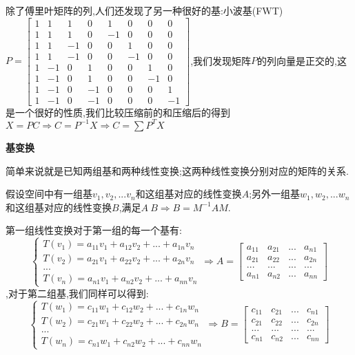 \documentclass[oneside]{book}
\begin{document}
	除了傅里叶矩阵的列,人们还发现了另一种很好的基:小波基(FWT)$P=\left[\begin{array}{cccccccc}
		1&1&1&0&1&0&0&0\\	1&1&1&0&-1&0&0&0\\
		1&1&-1&0&0&1&0&0\\	1&1&-1&0&0&-1&0&0\\	1&-1&0&1&0&0&1&0\\	1&-1&0&1&0&0&-1&0\\	1&-1&0&-1&0&0&0&1\\	1&-1&0&-1&0&0&0&-1
	\end{array}\right]$,我们发现矩阵$P$的列向量是正交的,这是一个很好的性质,我们比较压缩前的和压缩后的得到$X=PC\Rightarrow C=P^{-1}X\Rightarrow C=\sum P^{T}X$
	
	\textbf{基变换}
	
	简单来说就是已知两组基和两种线性变换;这两种线性变换分别对应的矩阵的关系.
	
	假设空间中有一组基$v_{1},v_{2},...v_{n}$和这组基对应的线性变换$A$;另外一组基$w_{1},w_{2},...w_{n}$和这组基对应的线性变换$B$,满足$A~B$$\Rightarrow B=M^{-1}AM$.
	
	第一组线性变换对于第一组的每一个基有:
	$$\left\{\begin{array}{c}
	T(v_{1})=a_{11}v_{1}+a_{12}v_{2}+...+a_{1n}v_{n}\\T(v_{2})=a_{21}v_{1}+a_{22}v_{2}+...+a_{2n}v_{n}\\...\\T(v_{n})=a_{n1}v_{1}+a_{n2}v_{2}+...+a_{nn}v_{n}
\end{array}\right.\Rightarrow A=\left[\begin{array}{cccc}
	a_{11}&a_{21}&...&a_{n1}\\a_{21}&a_{22}&...&a_{2n}\\...&...&...&...\\a_{n1}&a_{n2}&...&a_{nn}
\end{array}\right]$$,对于第二组基,我们同样可以得到:	$$\left\{\begin{array}{c}
T(w_{1})=c_{11}w_{1}+c_{12}w_{2}+...+c_{1n}w_{n}\\T(w_{2})=c_{21}w_{1}+c_{22}w_{2}+...+c_{2n}w_{n}\\...\\T(w_{n})=c_{n1}w_{1}+c_{n2}w_{2}+...+c_{nn}w_{n}
\end{array}\right.\Rightarrow B=\left[\begin{array}{cccc}
c_{11}&c_{21}&...&c_{n1}\\c_{21}&c_{22}&...&c_{2n}\\...&...&...&...\\c_{n1}&c_{n2}&...&c_{nn}
\end{array}\right]$$
\end{document}
